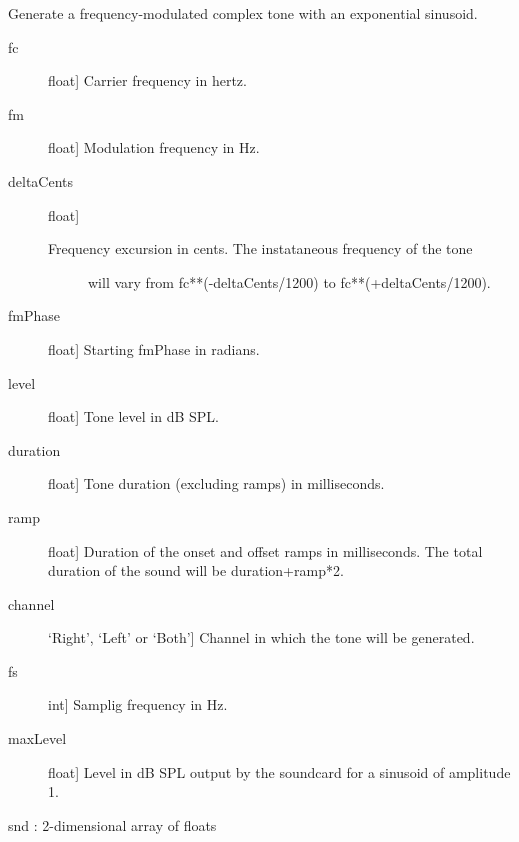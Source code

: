 \documentclass[letterpaper,10pt,english]{sphinxmanual}
\begin{document}
\begin{fulllineitems}
\label{index:sndlib.expSinFMComplex}
Generate a frequency-modulated complex tone with an exponential sinusoid.
\begin{description}
\item[{fc}] \leavevmode{[}float{]}
Carrier frequency in hertz.

\item[{fm}] \leavevmode{[}float{]}
Modulation frequency in Hz.

\item[{deltaCents}] \leavevmode{[}float{]}\begin{description}
\item[{Frequency excursion in cents. The instataneous frequency of the tone}] \leavevmode
will vary from fc**(-deltaCents/1200) to fc**(+deltaCents/1200).

\end{description}

\item[{fmPhase}] \leavevmode{[}float{]}
Starting fmPhase in radians.

\item[{level}] \leavevmode{[}float{]}
Tone level in dB SPL.

\item[{duration}] \leavevmode{[}float{]}
Tone duration (excluding ramps) in milliseconds.

\item[{ramp}] \leavevmode{[}float{]}
Duration of the onset and offset ramps in milliseconds.
The total duration of the sound will be duration+ramp*2.

\item[{channel}] \leavevmode{[}`Right', `Left' or `Both'{]}
Channel in which the tone will be generated.

\item[{fs}] \leavevmode{[}int{]}
Samplig frequency in Hz.

\item[{maxLevel}] \leavevmode{[}float{]}
Level in dB SPL output by the soundcard for a sinusoid of
amplitude 1.

\end{description}

snd : 2-dimensional array of floats


\end{fulllineitems}
\end{document}
